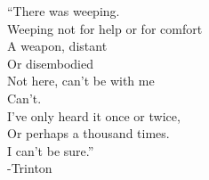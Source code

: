 \documentclass[11pt]{article}
\begin{document}
\vspace*{5\baselineskip}

\begingroup
\begin{center}
``There was weeping. \\ Weeping not for help or for comfort \\  A weapon, distant \\  Or disembodied \\ Not here, can't be with me \\ Can't. \\ I've only heard it once or twice, \\ Or perhaps a thousand times. \\ I can't be sure.'' \\ \vspace*{1\baselineskip} -Trinton
\end{center}
\endgroup
\end{document}
